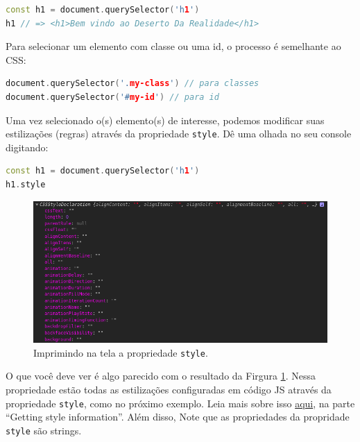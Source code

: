 \begin{lstlisting}[language=C++]
const h1 = document.querySelector('h1')
h1 // => <h1>Bem vindo ao Deserto Da Realidade</h1>
\end{lstlisting}

\hfill

Para selecionar um elemento com classe ou uma id, o processo é semelhante ao CSS: \\


\begin{lstlisting}[language=C++]
document.querySelector('.my-class') // para classes
document.querySelector('#my-id') // para id
\end{lstlisting}

\hfill

Uma vez selecionado o(s) elemento(s) de interesse, podemos modificar suas estilizações (regras) através da propriedade \texttt{style}. Dê uma olhada no seu console digitando:\\

\begin{lstlisting}[language=C++]
const h1 = document.querySelector('h1')
h1.style
\end{lstlisting}

\begin{figure}[h!]
    \centering
    \includegraphics[scale=.5]{imgs/style-prop.png}
    \caption{Imprimindo na tela a propriedade \texttt{style}.}
    \label{fig:style-prop}
\end{figure}


O que você deve ver é algo parecido com o resultado da Firgura \ref{fig:style-prop}. Nessa propriedade estão todas as estilizações configuradas em código JS através da propriedade \texttt{style}, como no próximo exemplo. Leia mais sobre isso \href{https://developer.mozilla.org/en-US/docs/Web/API/ElementCSSInlineStyle/style}{aqui}, na parte ``Getting style information''. Além disso, Note que as propriedades da propridade \texttt{style} são strings.


